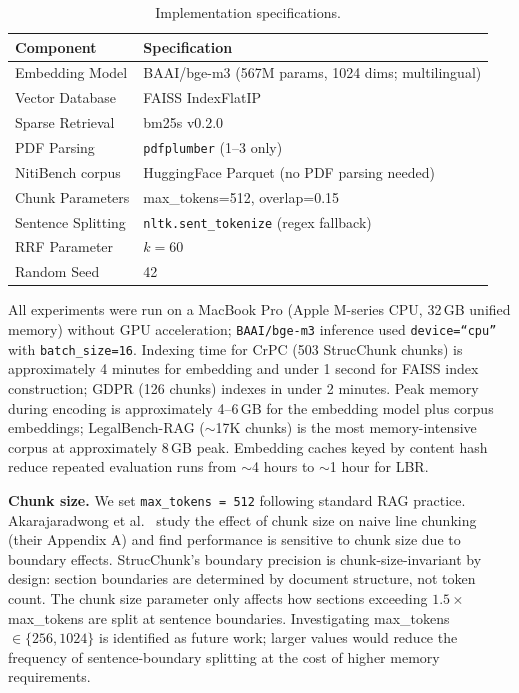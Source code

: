 \documentclass[sn-mathphys,Numbered]{sn-jnl}%
\begin{document}
\begin{table}[htbp]
\centering
\begin{tabular}{ll}
\toprule
\textbf{Component} & \textbf{Specification} \\
\midrule
Embedding Model    & BAAI/bge-m3 (567M params, 1024 dims; multilingual) \\
Vector Database    & FAISS IndexFlatIP \\
Sparse Retrieval   & bm25s v0.2.0 \\
PDF Parsing        & \texttt{pdfplumber} (1--3 only) \\
NitiBench corpus   & HuggingFace Parquet (no PDF parsing needed) \\
Chunk Parameters   & max\_tokens=512, overlap=0.15 \\
Sentence Splitting & \texttt{nltk.sent\_tokenize} (regex fallback) \\
RRF Parameter      & $k = 60$ \\
Random Seed        & 42 \\
\bottomrule
\end{tabular}
\caption{Implementation specifications.}
\label{tab:implementation}
\end{table}

All experiments were run on a MacBook Pro (Apple M-series CPU, 32\,GB unified memory) without GPU acceleration; \texttt{BAAI/bge-m3} inference used \texttt{device=``cpu''} with \texttt{batch\_size=16}.  Indexing time for CrPC (503 StrucChunk chunks) is approximately 4 minutes for embedding and under 1 second for FAISS index construction; GDPR (126 chunks) indexes in under 2 minutes.  Peak memory during encoding is approximately 4--6\,GB for the embedding model plus corpus embeddings; LegalBench-RAG ($\sim$17K chunks) is the most memory-intensive corpus at approximately 8\,GB peak.  Embedding caches keyed by content hash reduce repeated evaluation runs from $\sim$4 hours to $\sim$1 hour for LBR.

\textbf{Chunk size.}  We set \texttt{max\_tokens = 512} following standard RAG practice.  Akarajaradwong et al.~\cite{akarajaradwong2025nitibenchcomprehensivestudyllm} study the effect of chunk size on naive line chunking (their Appendix A) and find performance is sensitive to chunk size due to boundary effects.  StrucChunk's boundary precision is chunk-size-invariant by design: section boundaries are determined by document structure, not token count.  The chunk size parameter only affects how sections exceeding $1.5\times$ max\_tokens are split at sentence boundaries.  Investigating max\_tokens $\in \{256, 1024\}$ is identified as future work; larger values would reduce the frequency of sentence-boundary splitting at the cost of higher memory requirements.
\end{document}
